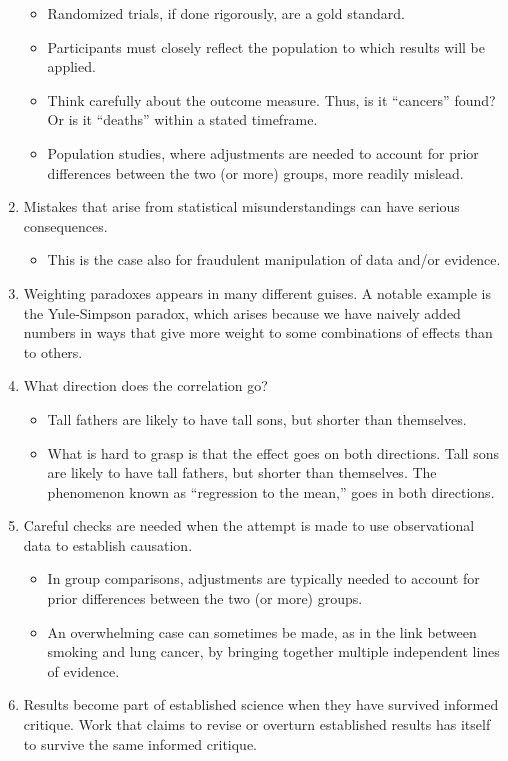 \documentclass[
  10pt,
  b5paper]{book}
\providecommand{\tightlist}{%
  \setlength{\itemsep}{0pt}\setlength{\parskip}{0pt}}
\begin{document}
\begin{enumerate}
  \begin{itemize}
  \tightlist
  \item
    Randomized trials, if done rigorously, are a gold standard.
  \item
    Participants must closely reflect the population to which
    results will be applied.
  \item
    Think carefully about the outcome measure. Thus, is it
    ``cancers'' found? Or is it ``deaths'' within a stated timeframe.
  \item
    Population studies, where adjustments are needed
    to account for prior differences between the two (or more)
    groups, more readily mislead.
  \end{itemize}
\item
  Mistakes that arise from statistical misunderstandings
  can have serious consequences.

  \begin{itemize}
  \tightlist
  \item
    This is the case also for fraudulent manipulation of
    data and/or evidence.
  \end{itemize}
\item
  Weighting paradoxes appears in many different guises.
  A notable example is the Yule-Simpson paradox, which arises
  because we have naively added numbers in ways that give more
  weight to some combinations of effects than to others.
\item
  What direction does the correlation go?

  \begin{itemize}
  \tightlist
  \item
    Tall fathers are likely to have tall sons, but shorter than themselves.
  \item
    What is hard to grasp is that the effect goes on both directions.
    Tall sons are likely to have tall fathers, but shorter than themselves.
    The phenomenon known as ``regression to the mean,''
    goes in both directions.
  \end{itemize}
\item
  Careful checks are needed when the attempt is made to use
  observational data to establish causation.

  \begin{itemize}
  \tightlist
  \item
    In group comparisons, adjustments are typically needed
    to account for prior differences between the two (or more)
    groups.
  \item
    An overwhelming case can sometimes be made, as in the link
    between smoking and lung cancer, by bringing together multiple
    independent lines of evidence.
  \end{itemize}
\item
  Results become part of established science when they have
  survived informed critique. Work that claims to revise or overturn
  established results has itself to survive the same informed critique.


\end{enumerate}
\end{document}
